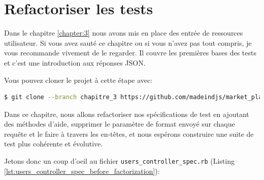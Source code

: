 \documentclass[]{report}
\begin{document}
\chapter{Refactoriser les tests}\label{chapter:4}

  Dans le chapitre \ref{chapter:3} nous avons mis en place des entrée de ressources utilisateur. Si vous avez sauté ce chapitre ou si vous n'avez pas tout compris, je vous recommande vivement de le regarder. Il couvre les premières bases des tests et c'est une introduction aux réponses JSON.

  Vous pouvez cloner le projet à cette étape avec:

  \begin{scriptsize}
    \begin{lstlisting}[language=bash]
    $ git clone --branch chapitre_3 https://github.com/madeindjs/market_place_api
    \end{lstlisting}
  \end{scriptsize}

  Dans ce chapitre, nous allons refactoriser nos spécifications de test en ajoutant des méthodes d'aide, supprimer le paramètre de format envoyé sur chaque requête et le faire à travers les en-têtes, et nous espérons construire une suite de test plus cohérente et évolutive.

  Jetons donc un coup d'oeil au fichier \verb|users_controller_spec.rb| (Listing \ref{lst:users_controller_spec_before_factorization}):
\end{document}
